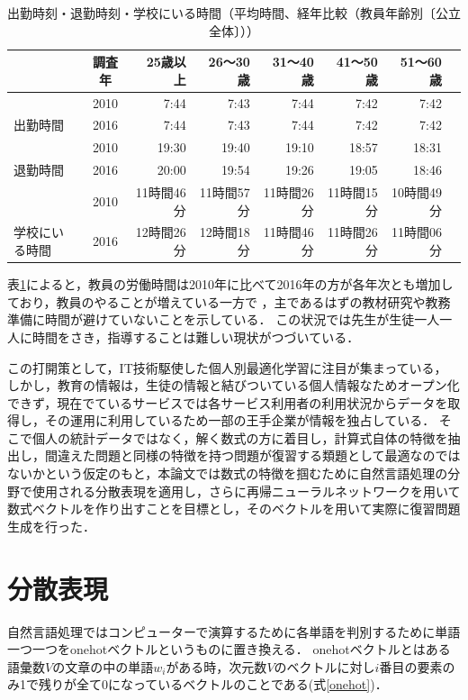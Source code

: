 \documentclass[a4j,11pt,report]{jsbook}
\begin{document}
\begin{center}
  \begin{table}[H]
    \caption{出勤時刻・退勤時刻・学校にいる時間（平均時間、経年比較（教員年齢別〔公立全体〕））}
    \begin{tabular}{|l|c|r|r|r|r|r|r|} \hline
      & 調査年 & 25歳以上 & 26〜30歳 & 31〜40歳 & 41〜50歳 & 51〜60歳  \\ \hline \hline
      & 2010 & 7:44 & 7:43 & 7:44 & 7:42 & 7:42 \\ \cline{2-7}
      出勤時間 & 2016 & 7:44 & 7:43 & 7:44 & 7:42 & 7:42 \\ \cline{2-7}\hline
      & 2010 & 19:30 & 19:40 & 19:10 & 18:57 & 18:31 \\ \cline{2-7}
      退勤時間 & 2016 & 20:00 & 19:54 & 19:26 & 19:05 & 18:46 \\ \cline{2-7}\hline
      & 2010 & 11時間46分 & 11時間57分 & 11時間26分 & 11時間15分 & 10時間49分  \\ \cline{2-7}
      学校にいる時間  & 2016 & 12時間26分 & 12時間18分 & 11時間46分 & 11時間26分 & 11時間06分 \\ \cline{2-7}\hline
    \end{tabular}
    \label{tb:teacher_time}
  \end{table}
\end{center}

表\ref{tb:teacher_time}によると，教員の労働時間は2010年に比べて2016年の方が各年次とも増加しており，教員のやることが増えている一方で
，主であるはずの教材研究や教務準備に時間が避けていないことを示している．
この状況では先生が生徒一人一人に時間をさき，指導することは難しい現状がつづいている．

この打開策として，IT技術駆使した個人別最適化学習に注目が集まっている，
しかし，教育の情報は，生徒の情報と結びついている個人情報なためオープン化できず，現在でているサービスでは各サービス利用者の利用状況からデータを取得し，その運用に利用しているため一部の王手企業が情報を独占している．
そこで個人の統計データではなく，解く数式の方に着目し，計算式自体の特徴を抽出し，間違えた問題と同様の特徴を持つ問題が復習する類題として最適なのではないかという仮定のもと，本論文では数式の特徴を掴むために自然言語処理の分野で使用される分散表現を適用し，さらに再帰ニューラルネットワークを用いて数式ベクトルを作り出すことを目標とし，そのベクトルを用いて実際に復習問題生成を行った．

\chapter{分散表現\label{ch:Distributed representation}}
自然言語処理ではコンピューターで演算するために各単語を判別するために単語一つ一つをonehotベクトルというものに置き換える．
onehotベクトルとはある語彙数$V$の文章の中の単語$w_{i}$がある時，次元数$V$のベクトルに対し$i$番目の要素のみ1で残りが全て0になっているベクトルのことである(式\ref{onehot})．
\end{document}
